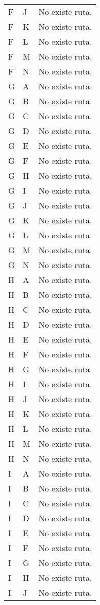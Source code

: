 \documentclass{article}
\begin{document}
\begin{longtable}{llp{}}
F & J & No existe ruta.\\
F & K & No existe ruta.\\
F & L & No existe ruta.\\
F & M & No existe ruta.\\
F & N & No existe ruta.\\
G & A & No existe ruta.\\
G & B & No existe ruta.\\
G & C & No existe ruta.\\
G & D & No existe ruta.\\
G & E & No existe ruta.\\
G & F & No existe ruta.\\
G & H & No existe ruta.\\
G & I & No existe ruta.\\
G & J & No existe ruta.\\
G & K & No existe ruta.\\
G & L & No existe ruta.\\
G & M & No existe ruta.\\
G & N & No existe ruta.\\
H & A & No existe ruta.\\
H & B & No existe ruta.\\
H & C & No existe ruta.\\
H & D & No existe ruta.\\
H & E & No existe ruta.\\
H & F & No existe ruta.\\
H & G & No existe ruta.\\
H & I & No existe ruta.\\
H & J & No existe ruta.\\
H & K & No existe ruta.\\
H & L & No existe ruta.\\
H & M & No existe ruta.\\
H & N & No existe ruta.\\
I & A & No existe ruta.\\
I & B & No existe ruta.\\
I & C & No existe ruta.\\
I & D & No existe ruta.\\
I & E & No existe ruta.\\
I & F & No existe ruta.\\
I & G & No existe ruta.\\
I & H & No existe ruta.\\
I & J & No existe ruta.\\

\end{longtable}
\end{document}
